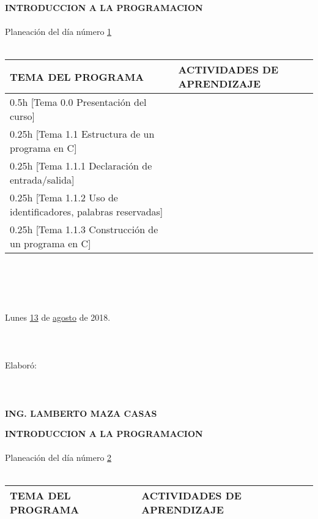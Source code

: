 \documentclass[landscape]{article}
\begin{document}
{\large
\begin{center}
{\bf 
INTRODUCCION A LA PROGRAMACION
}
\ \\
\ \\
Planeaci\'on del d\'ia n\'umero \underline{\hspace{0.5cm}1\hspace{0.5cm}}
\ \\
\ \\
\begin{tabular}{|p{11cm}|p{8cm}|}\hline
{\bf TEMA DEL PROGRAMA}&{\bf ACTIVIDADES DE APRENDIZAJE}\\\hline
	0.5h	[Tema 0.0 Presentaci\'on del curso]
&\\
	0.25h	[Tema 1.1 Estructura de un programa en C]
&\\
	0.25h	[Tema 1.1.1 Declaraci\'on de entrada/salida]
&\\
	0.25h	[Tema 1.1.2 Uso de identificadores, palabras reservadas]
&\\
	0.25h	[Tema 1.1.3 Construcci\'on de un programa en C]
&\\
\hline
\end{tabular}
\ \\
\ \\
\ \\
\ \\
Lunes \underline{\hspace{0.5cm}13\hspace{0.5cm}} de  \underline{\hspace{0.5cm}agosto\hspace{0.5cm}} de 2018.
\ \\
\ \\
\ \\
\ \\
Elabor\'o:
\ \\
\ \\
\ \\
\ \\
{\bf ING. LAMBERTO MAZA CASAS}
\end{center}
\eject
\begin{center}
{\bf 
INTRODUCCION A LA PROGRAMACION
}
\ \\
\ \\
Planeaci\'on del d\'ia n\'umero \underline{\hspace{0.5cm}2\hspace{0.5cm}}
\ \\
\ \\
\begin{tabular}{|p{11cm}|p{8cm}|}\hline
{\bf TEMA DEL PROGRAMA}&{\bf ACTIVIDADES DE APRENDIZAJE}\\\hline

\end{tabular}
\end{center}}
\end{document}
